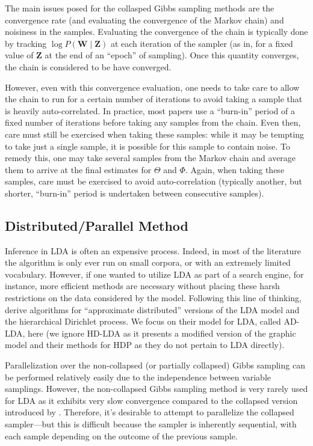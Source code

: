\documentclass[11pt]{article}
\begin{document}
The main issues posed for the collasped Gibbs sampling methods are the
convergence rate (and evaluating the convergence of the Markov chain) and
noisiness in the samples. Evaluating the convergence of the chain is
typically done by tracking $\log P(\mathbf{W} \mid \mathbf{Z})$ at each
iteration of the sampler (as in, for a fixed value of $\mathbf{Z}$ at the
end of an ``epoch'' of sampling). Once this quantity converges, the chain
is considered to be have converged.

However, even with this convergence evaluation, one needs to take care to
allow the chain to run for a certain number of iterations to avoid taking a
sample that is heavily auto-correlated. In practice, most papers use a
``burn-in'' period of a fixed number of iterations before taking any
samples from the chain. Even then, care must still be exercised when taking
these samples: while it may be tempting to take just a single sample, it is
possible for this sample to contain noise. To remedy this, one may take
several samples from the Markov chain and average them to arrive at the
final estimates for $\Theta$ and $\Phi$. Again, when taking these samples,
care must be exercised to avoid auto-correlation (typically another, but
shorter, ``burn-in'' period is undertaken between consecutive samples).

\subsection{Distributed/Parallel Method}

Inference in LDA is often an expensive process. Indeed, in most of the
literature the algorithm is only ever run on small corpora, or with an
extremely limited vocabulary. However, if one wanted to utilize LDA as part
of a search engine, for instance, more efficient methods are necessary
without placing these harsh restrictions on the data considered by the
model. Following this line of thinking, \citet{Newman:2009:ADLDA} derive
algorithms for ``approximate distributed'' versions of the LDA model and
the hierarchical Dirichlet process. We focus on their model for LDA, called
AD-LDA, here (we ignore HD-LDA as it presents a modified version of the
graphic model and their methods for HDP as they do not pertain to LDA
directly).

Parallelization over the non-collapsed (or partially collapsed) Gibbs
sampling can be performed relatively easily due to the independence between
variable samplings. However, the non-collapsed Gibbs sampling method is
very rarely used for LDA as it exhibits very slow convergence compared to
the collapsed version introduced by \citet{Griffiths:2004:Topics}.
Therefore, it's desirable to attempt to parallelize the collapsed
sampler---but this is difficult because the sampler is inherently
sequential, with each sample depending on the outcome of the previous
sample.
\end{document}
